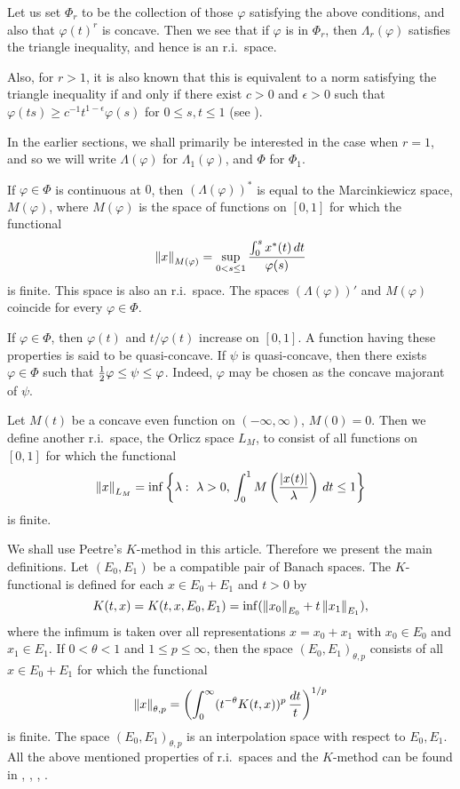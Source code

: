 Let us set $\Phi_r$ to be the collection of those $\varphi$ satisfying
the above conditions, and also that $\varphi(t)^r$ is
concave.  Then we see that if $\varphi$ is in $\Phi_r$, then
$\Lambda_r(\varphi)$ satisfies the triangle inequality, and hence is an
r.i.\ space.

Also, for $r>1$,
it is also known that this is equivalent to a norm satisfying the
triangle inequality if and only if there exist $c>0$ and $\epsilon>0$
such that $\varphi(ts) \ge c^{-1} t^{1-\epsilon} \varphi(s)$ for
$0 \le s,t\le 1$ (see \cite{Sa}).

In the earlier sections, we shall primarily be interested in the case when
$r = 1$, and so we will write $\Lambda(\varphi)$ for $\Lambda_1(\varphi)$,
and $\Phi$ for $\Phi_1$.

If $\varphi \in \Phi$ is continuous at $0$, then $(\Lambda(\varphi))^*$
is equal to the Marcinkiewicz space,
$M(\varphi)$, where $M(\varphi)$ is the space of functions on $[0,1]$ for
which the functional
$$ \left\|x\right\|_{M(\varphi)} = \sup_{0<s\le 1}
   { \int_0^s x^*(t) \, dt \over \varphi(s) } $$
is finite.  This space is also an r.i.\ space.
The spaces $(\Lambda(\varphi))'$ and $M(\varphi)$ coincide for every
$\varphi \in \Phi$.

If $\varphi \in \Phi$, then $\varphi(t)$ and $t/\varphi(t)$ increase on
$[0,1]$.  A function having these properties is said to be quasi-concave.
If $\psi$ is quasi-concave, then there exists $\varphi \in \Phi$ such
that ${1\over2} \varphi \le \psi \le \varphi$.  Indeed, $\varphi$ may
be chosen as the concave majorant of $\psi$.

Let $M(t)$ be a concave even function on $(-\infty,\infty)$, $M(0) = 0$.
Then we define another r.i.\ space,
the Orlicz space $L_M$, to consist of all functions on $[0,1]$ for which
the functional
$$ \left\|x\right\|_{L_M} = \inf \left\{ \lambda :\ \lambda >0 , \,
   \int_0^1 M \left( {\left|x(t)\right| \over \lambda}\right) \, dt \le 1
   \right\} $$
is finite.

We shall use Peetre's $K$-method in this article.  Therefore we
present the main definitions.  Let $(E_0,E_1)$ be a compatible pair
of Banach spaces.  The $K$-functional is defined for each $x \in E_0 + E_1$
and $t>0$ by
$$ K(t,x) = K(t,x,E_0,E_1) = \inf(\left\|x_0\right\|_{E_0} + t\left\|x_1\right\|_{E_1}) ,$$
where the infimum is taken over all representations $x = x_0 + x_1$ with
$x_0 \in E_0$ and $x_1 \in E_1$.  If $0<\theta<1$ and $1 \le p \le \infty$,
then the space $(E_0,E_1)_{\theta,p}$ consists of all $x \in E_0+E_1$
for which the functional
$$ \left\|x\right\|_{\theta,p} = \left( \int_0^\infty (t^{-\theta} K(t,x))^p
   \, {dt\over t} \right)^{1/p} $$
is finite.  The space $(E_0,E_1)_{\theta,p}$ is an interpolation space
with respect to $E_0,E_1$.  All the above mentioned properties of r.i.\
spaces and the $K$-method can be found in \cite{BS}, \cite{BK}, 
\cite{KPS}, \cite{LT}.


